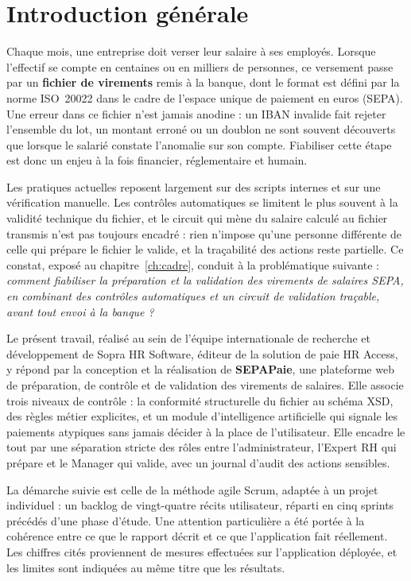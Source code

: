 \chapter*{Introduction générale}

Chaque mois, une entreprise doit verser leur salaire à ses employés. Lorsque l'effectif se compte en centaines ou en milliers de personnes, ce versement passe par un \textbf{fichier de virements} remis à la banque, dont le format est défini par la norme ISO~20022 dans le cadre de l'espace unique de paiement en euros (SEPA). Une erreur dans ce fichier n'est jamais anodine : un IBAN invalide fait rejeter l'ensemble du lot, un montant erroné ou un doublon ne sont souvent découverts que lorsque le salarié constate l'anomalie sur son compte. Fiabiliser cette étape est donc un enjeu à la fois financier, réglementaire et humain.

Les pratiques actuelles reposent largement sur des scripts internes et sur une vérification manuelle. Les contrôles automatiques se limitent le plus souvent à la validité technique du fichier, et le circuit qui mène du salaire calculé au fichier transmis n'est pas toujours encadré : rien n'impose qu'une personne différente de celle qui prépare le fichier le valide, et la traçabilité des actions reste partielle. Ce constat, exposé au chapitre~\ref{ch:cadre}, conduit à la problématique suivante : \emph{comment fiabiliser la préparation et la validation des virements de salaires SEPA, en combinant des contrôles automatiques et un circuit de validation traçable, avant tout envoi à la banque ?}

Le présent travail, réalisé au sein de l'équipe internationale de recherche et développement de Sopra HR Software, éditeur de la solution de paie HR Access, y répond par la conception et la réalisation de \textbf{SEPAPaie}, une plateforme web de préparation, de contrôle et de validation des virements de salaires. Elle associe trois niveaux de contrôle : la conformité structurelle du fichier au schéma XSD, des règles métier explicites, et un module d'intelligence artificielle qui signale les paiements atypiques sans jamais décider à la place de l'utilisateur. Elle encadre le tout par une séparation stricte des rôles entre l'administrateur, l'Expert RH qui prépare et le Manager qui valide, avec un journal d'audit des actions sensibles.

La démarche suivie est celle de la méthode agile Scrum, adaptée à un projet individuel : un backlog de vingt-quatre récits utilisateur, réparti en cinq sprints précédés d'une phase d'étude. Une attention particulière a été portée à la cohérence entre ce que le rapport décrit et ce que l'application fait réellement. Les chiffres cités proviennent de mesures effectuées sur l'application déployée, et les limites sont indiquées au même titre que les résultats.

